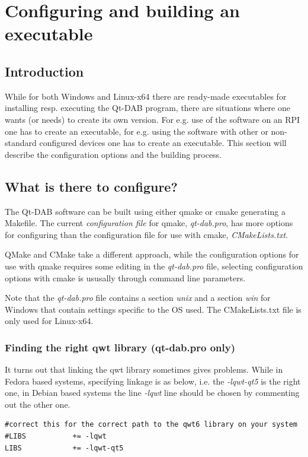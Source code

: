 \documentclass[12pt]{article}
\begin{document}
\section{Configuring and building an executable}
\subsection{Introduction}
While for both Windows and Linux-x64 there are ready-made executables
for installing resp. executing the Qt-DAB program, there are situations
where one wants (or needs) to create its own version.
For e.g. use of the software on an RPI one has to create an executable,
for e.g. using the software with other or non-standard configured devices
one has to create an executable.
This section will describe the configuration options and the building process.
\subsection{What is there to configure?}
The Qt-DAB software can be built using either qmake or cmake generating
a Makefile.
The current {\em configuration file} for qmake, {\em qt-dab.pro}, has
more options for configuring than the configuration file for use with cmake,
{\em CMakeLists.txt}.
\par
QMake and CMake take a different approach, while the configuration options
for use with qmake requires some editing in the {\em qt-dab.pro} file,
selecting configuration options with cmake is ususally through command line
parameters.
\par
Note that the {\em qt-dab.pro} file contains a section {\em unix}
and a section {\em win} for Windows that contain settings specific
to the OS used.
The CMakeLists.txt file is only used for Linux-x64.

\subsubsection{Finding the right qwt library (qt-dab.pro only)}
It turns out that linking the qwt library sometimes gives problems.
While in Fedora based systems, specifying linkage is as below,
i.e. the {\em -lqwt-qt5} is the right one, in Debian based systems the
line {\em -lqwt} line should be chosen by commenting out the other one.
{\small
\begin{verbatim}
#correct this for the correct path to the qwt6 library on your system
#LIBS           += -lqwt
LIBS            += -lqwt-qt5
\end{verbatim}
}
\end{document}
